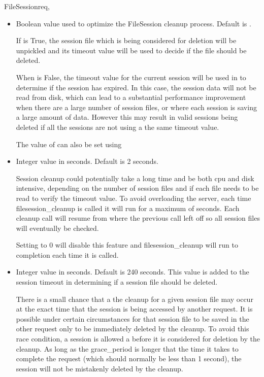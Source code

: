\begin{classdesc}{FileSession}{req, }
\begin{itemize}
    The value of  can also be set using
    .
    
  \item
    Boolean value used to optimize the FileSession cleanup process.
    Default is .
    
    If  is True, the session file which is being 
    considered for deletion will be unpickled and its timeout value
    will be used to decide if the file should be deleted. 
    
    When  is False, the timeout value for the current
    session will be used in to determine if the session has expired. In
    this case, the session data will not be read from disk, which can
    lead to a substantial performance improvement when there are a large
    number of session files, or where each session is saving a large 
    amount of data. However this may result in valid sessions being
    deleted if all the sessions are not using a the same timeout value.
    
    The value of  can also be set using
    
  \item
    Integer value in seconds. Default is 2 seconds.

    Session cleanup could potentially take a long time and be both cpu
    and disk intensive, depending on the number of session files and if
    each file needs to be read to verify the timeout value. To avoid
    overloading the server, each time filesession_cleanup is called it
    will run for a maximum of  seconds.
    Each cleanup call will resume from where the previous call left off
    so all session files will eventually be checked.

    Setting  to 0 will disable this 
    feature and filesession_cleanup will run to completion each time it
    is called.

  \item
    Integer value in seconds. Default is 240 seconds. This value is added
    to the session timeout in determining if a session file should be 
    deleted.
 
    There is a small chance that a the cleanup for a given session file
    may occur at the exact time that the session is being accessed by
    another request. It is possible under certain circumstances for that
    session file to be saved in the other request only to be immediately 
    deleted by the cleanup. To avoid this race condition, a session is
    allowed a  before it is considered for deletion by
    the cleanup.  As long as the grace_period is longer that the time it
    takes to complete the request (which should normally be less than 1
    second), the session will not be mistakenly deleted by the cleanup.


\end{itemize}
\end{classdesc}
